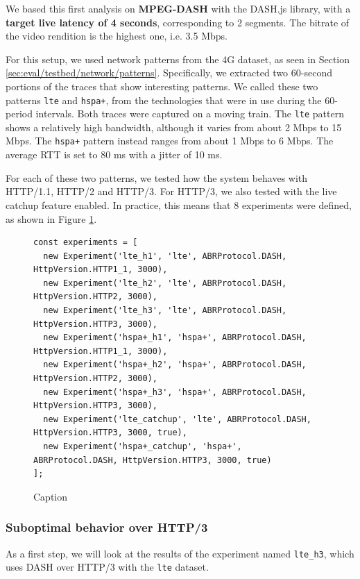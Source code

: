 We based this first analysis on \textbf{MPEG-DASH} with the DASH.js library, with a \textbf{target live latency of 4 seconds}, corresponding to 2 segments. The bitrate of the video rendition is the highest one, i.e. 3.5 Mbps.

For this setup, we used network patterns from the 4G dataset, as seen in Section \ref{sec:eval/testbed/network/patterns}. Specifically, we extracted two 60-second portions of the traces that show interesting patterns. We called these two patterns \texttt{lte} and \texttt{hspa+}, from the technologies that were in use during the 60-period intervals. Both traces were captured on a moving train. The \texttt{lte} pattern shows a relatively high bandwidth, although it varies from about 2 Mbps to 15 Mbps. The \texttt{hspa+} pattern instead ranges from about 1 Mbps to 6 Mbps. The average RTT is set to 80 ms with a jitter of 10 ms.

For each of these two patterns, we tested how the system behaves with HTTP/1.1, HTTP/2 and HTTP/3. For HTTP/3, we also tested with the live catchup feature enabled. In practice, this means that 8 experiments were defined, as shown in Figure \ref{fig:experiments1}.

\begin{figure}[h]
    \centering
    \begin{verbatim}
const experiments = [
  new Experiment('lte_h1', 'lte', ABRProtocol.DASH, HttpVersion.HTTP1_1, 3000),
  new Experiment('lte_h2', 'lte', ABRProtocol.DASH, HttpVersion.HTTP2, 3000),
  new Experiment('lte_h3', 'lte', ABRProtocol.DASH, HttpVersion.HTTP3, 3000),
  new Experiment('hspa+_h1', 'hspa+', ABRProtocol.DASH, HttpVersion.HTTP1_1, 3000),
  new Experiment('hspa+_h2', 'hspa+', ABRProtocol.DASH, HttpVersion.HTTP2, 3000),
  new Experiment('hspa+_h3', 'hspa+', ABRProtocol.DASH, HttpVersion.HTTP3, 3000),
  new Experiment('lte_catchup', 'lte', ABRProtocol.DASH, HttpVersion.HTTP3, 3000, true),
  new Experiment('hspa+_catchup', 'hspa+', ABRProtocol.DASH, HttpVersion.HTTP3, 3000, true)
];
    \end{verbatim}
    \caption{Caption}
    \label{fig:experiments1}
\end{figure}

\subsubsection{Suboptimal behavior over HTTP/3}
\label{sec:eval/non-abr/h3-preemption}

As a first step, we will look at the results of the experiment named \texttt{lte\_h3}, which uses DASH over HTTP/3 with the \texttt{lte} dataset.

